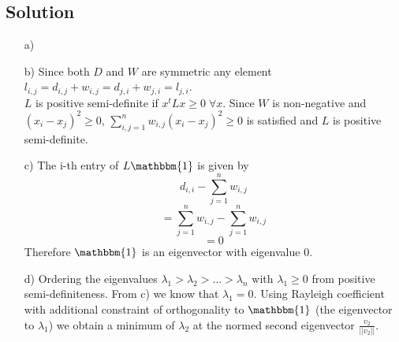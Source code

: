 \documentclass[10pt]{article}
\numberwithin{equation}{section}
\begin{document}
\subsection*{Solution}
\begin{enumerate}
  \item[a)]{}
  \item[b)]{
      Since both $D$ and $W$ are symmetric any element $l_{i,j} = d_{i,j} + w_{i,j} = d_{j,i} + w_{j,i} = l_{j,i}$.\\ $L$ is positive semi-definite if $x^t Lx \geq 0 \; \forall x$. Since $W$ is non-negative and $(x_i - x_j)^2 \geq 0$, $\sum_{i,j=1}^n w_{i,j} (x_i - x_j)^2 \geq 0$ is satisfied and $L$ is positive semi-definite.
    }
  \item[c)]{
      The i-th entry of $L \mathbbm{1}$ is given by
      $$d_{i,i} - \sum_{j=1}^n w_{i,j}$$
      $$= \sum_{j=1}^n w_{i,j}- \sum_{j=1}^n w_{i,j}$$
      $$=0$$
      Therefore $\mathbbm{1}$ is an eigenvector with eigenvalue $0$.
    }
  \item[d)]{
      Ordering the eigenvalues $\lambda_1 > \lambda_2 > \dots > \lambda_n$ with $\lambda_1 \geq 0$ from positive semi-definiteness. From c) we know that $\lambda_1 = 0$. Using Rayleigh coefficient with additional constraint of orthogonality to $\mathbbm{1}$ (the eigenvector to $\lambda_1$) we obtain a minimum of $\lambda_2$ at the normed second eigenvector $\frac{v_2}{||v_2||}$.
    }
\end{enumerate}
\end{document}
